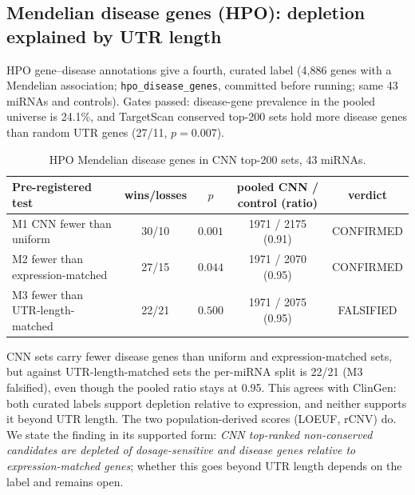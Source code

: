 \subsection{Mendelian disease genes (HPO): depletion explained by UTR length}
HPO gene--disease annotations give a fourth, curated label (4,886 genes with a Mendelian association; \texttt{hpo\_disease\_genes}, committed before running; same 43 miRNAs and controls). Gates passed: disease-gene prevalence in the pooled universe is 24.1\%, and TargetScan conserved top-200 sets hold more disease genes than random UTR genes (27/11, $p=0.007$).
\begin{table}[h]\centering\small\begin{tabular}{lcccc}\hline Pre-registered test & wins/losses & $p$ & pooled CNN / control (ratio) & verdict\\\hline
M1 CNN fewer than uniform & 30/10 & $0.001$ & 1971 / 2175 (0.91) & CONFIRMED \\
M2 fewer than expression-matched & 27/15 & $0.044$ & 1971 / 2070 (0.95) & CONFIRMED \\
M3 fewer than UTR-length-matched & 22/21 & $0.500$ & 1971 / 2075 (0.95) & FALSIFIED \\
\hline\end{tabular}\caption{HPO Mendelian disease genes in CNN top-200 sets, 43 miRNAs.}\label{tab:hpo}\end{table}
CNN sets carry fewer disease genes than uniform and expression-matched sets, but against UTR-length-matched sets the per-miRNA split is 22/21 (M3 falsified), even though the pooled ratio stays at 0.95. This agrees with ClinGen: both curated labels support depletion relative to expression, and neither supports it beyond UTR length. The two population-derived scores (LOEUF, rCNV) do. We state the finding in its supported form: \emph{CNN top-ranked non-conserved candidates are depleted of dosage-sensitive and disease genes relative to expression-matched genes}; whether this goes beyond UTR length depends on the label and remains open.
